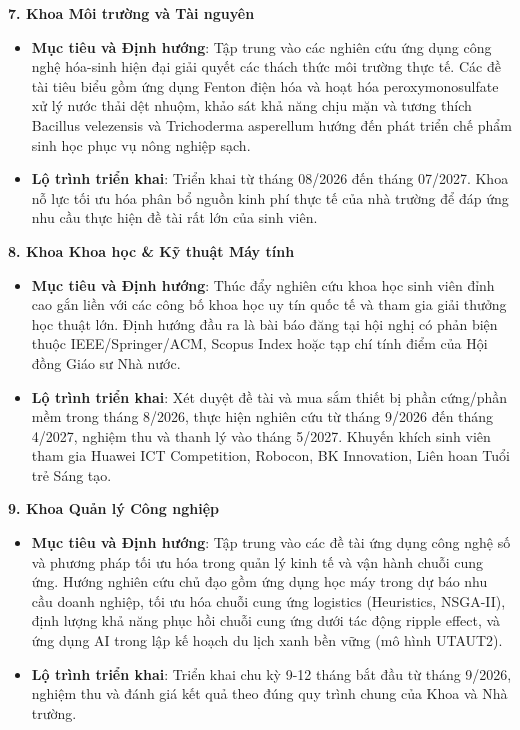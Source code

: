\documentclass[11pt,a4paper]{article}
\providecommand{\tightlist}{%
  \setlength{\itemsep}{0pt}\setlength{\parskip}{0pt}}
\begin{document}
\textbf{7. Khoa Môi trường và Tài nguyên}

\begin{itemize}
\tightlist
\item
  \textbf{Mục tiêu và Định hướng}: Tập trung vào các nghiên cứu ứng dụng
  công nghệ hóa-sinh hiện đại giải quyết các thách thức môi trường thực
  tế. Các đề tài tiêu biểu gồm ứng dụng Fenton điện hóa và hoạt hóa
  peroxymonosulfate xử lý nước thải dệt nhuộm, khảo sát khả năng chịu
  mặn và tương thích Bacillus velezensis và Trichoderma asperellum hướng
  đến phát triển chế phẩm sinh học phục vụ nông nghiệp sạch.
\item
  \textbf{Lộ trình triển khai}: Triển khai từ tháng 08/2026 đến tháng
  07/2027. Khoa nỗ lực tối ưu hóa phân bổ nguồn kinh phí thực tế của nhà
  trường để đáp ứng nhu cầu thực hiện đề tài rất lớn của sinh viên.
\end{itemize}

\textbf{8. Khoa Khoa học \& Kỹ thuật Máy tính}

\begin{itemize}
\tightlist
\item
  \textbf{Mục tiêu và Định hướng}: Thúc đẩy nghiên cứu khoa học sinh
  viên đỉnh cao gắn liền với các công bố khoa học uy tín quốc tế và tham
  gia giải thưởng học thuật lớn. Định hướng đầu ra là bài báo đăng tại
  hội nghị có phản biện thuộc IEEE/Springer/ACM, Scopus Index hoặc tạp
  chí tính điểm của Hội đồng Giáo sư Nhà nước.
\item
  \textbf{Lộ trình triển khai}: Xét duyệt đề tài và mua sắm thiết bị
  phần cứng/phần mềm trong tháng 8/2026, thực hiện nghiên cứu từ tháng
  9/2026 đến tháng 4/2027, nghiệm thu và thanh lý vào tháng 5/2027.
  Khuyến khích sinh viên tham gia Huawei ICT Competition, Robocon, BK
  Innovation, Liên hoan Tuổi trẻ Sáng tạo.
\end{itemize}

\textbf{9. Khoa Quản lý Công nghiệp}

\begin{itemize}
\tightlist
\item
  \textbf{Mục tiêu và Định hướng}: Tập trung vào các đề tài ứng dụng
  công nghệ số và phương pháp tối ưu hóa trong quản lý kinh tế và vận
  hành chuỗi cung ứng. Hướng nghiên cứu chủ đạo gồm ứng dụng học máy
  trong dự báo nhu cầu doanh nghiệp, tối ưu hóa chuỗi cung ứng logistics
  (Heuristics, NSGA-II), định lượng khả năng phục hồi chuỗi cung ứng
  dưới tác động ripple effect, và ứng dụng AI trong lập kế hoạch du lịch
  xanh bền vững (mô hình UTAUT2).
\item
  \textbf{Lộ trình triển khai}: Triển khai chu kỳ 9-12 tháng bắt đầu từ
  tháng 9/2026, nghiệm thu và đánh giá kết quả theo đúng quy trình chung
  của Khoa và Nhà trường.
\end{itemize}
\end{document}

